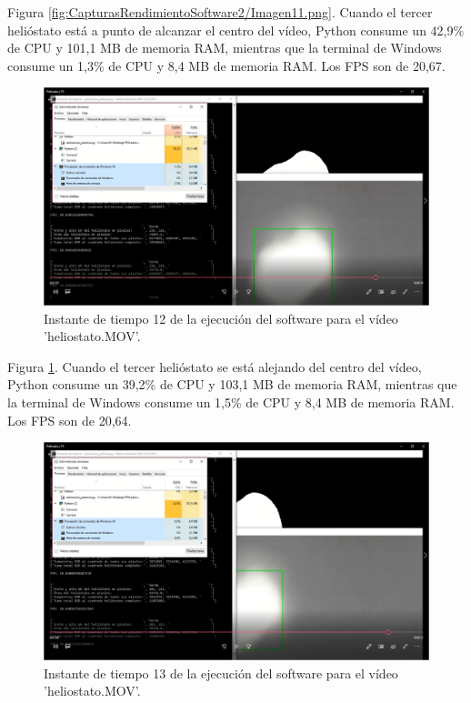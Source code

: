 Figura \ref{fig:CapturasRendimientoSoftware2/Imagen11.png}. Cuando el tercer helióstato está a punto de alcanzar el centro del vídeo, Python consume un 42,9\% de CPU y 101,1 MB de memoria RAM, mientras que la terminal de Windows consume un 1,3\% de CPU y 8,4 MB de memoria RAM. Los FPS son de 20,67.\\[20pt]

\begin{figure}[h!]
  	\centering
	\includegraphics[width=\textwidth]{CapturasRendimientoSoftware2/Imagen12.png}
	\caption{Instante de tiempo 12 de la ejecución del software para el vídeo 'heliostato.MOV'.
	\label{fig:CapturasRendimientoSoftware2/Imagen12.png}}
\end{figure}

Figura \ref{fig:CapturasRendimientoSoftware2/Imagen12.png}. Cuando el tercer helióstato se está alejando del centro del vídeo, Python consume un 39,2\% de CPU y 103,1 MB de memoria RAM, mientras que la terminal de Windows consume un 1,5\% de CPU y 8,4 MB de memoria RAM. Los FPS son de 20,64.\\[20pt]

\begin{figure}[h!]
  	\centering
	\includegraphics[width=\textwidth]{CapturasRendimientoSoftware2/Imagen13.png}
	\caption{Instante de tiempo 13 de la ejecución del software para el vídeo 'heliostato.MOV'.
	\label{fig:CapturasRendimientoSoftware2/Imagen13.png}}
\end{figure}

